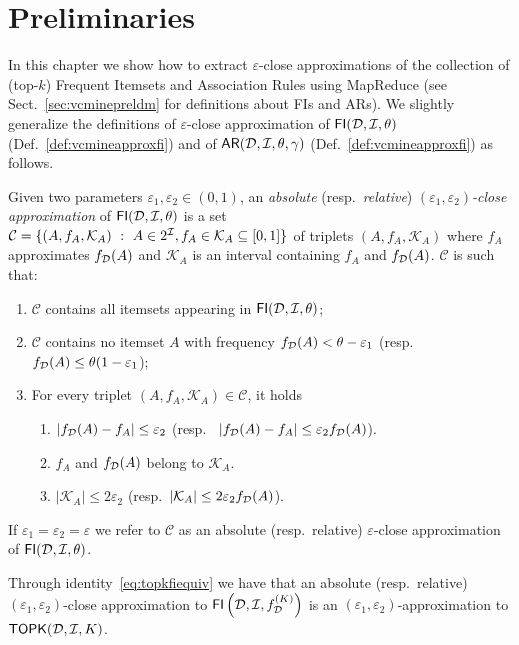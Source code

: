 \section{Preliminaries} \label{sec:parmadef}
In this chapter we show how to extract $\varepsilon$-close approximations of the
collection of (top-$k$) Frequent Itemsets and Association Rules using MapReduce
(see Sect.~\ref{sec:vcminepreldm} for definitions about FIs and ARs). We slightly
generalize the definitions of $\varepsilon$-close
approximation of $\mathsf{FI}({\cal D},{\cal I},\theta)$ (Def.~\ref{def:vcmineapproxfi}) and of
$\mathsf{AR}({\cal D},{\cal I},\theta,\gamma)$ (Def.~\ref{def:vcmineapproxfi}) as follows.

\begin{definition}\label{def:parmaeapproxfi}
  Given two parameters $\varepsilon_1,\varepsilon_2\in(0,1)$, an \emph{absolute}
  (resp.~\emph{relative}) \emph{
  $(\varepsilon_1,\varepsilon_2)$-close approximation} of
  $\mathsf{FI}({\cal D},{\cal I},\theta)$ is a set $\mathcal{C}=\{(A, f_A, \mathcal{K}_A) ~:~ A\in 2^{\cal I},
  f_A\in\mathcal{K}_A\subseteq[0,1]\}$ of triplets $(A, f_A, \mathcal{K}_A)$ where
  $f_A$ approximates $f_{\cal D}(A)$ and $\mathcal{K}_A$ is an interval containing
  $f_A$ and $f_{\cal D}(A)$.
  $\mathcal{C}$ is such that:
  \begin{enumerate}
    \item $\mathcal{C}$ contains all itemsets appearing in
      $\mathsf{FI}({\cal D},{\cal I},\theta)$;
    \item $\mathcal{C}$ contains no itemset $A$ with frequency $f_{\cal D}(A)<\theta -
      \varepsilon_1$ (resp.~ $f_{\cal D}(A)\le\theta(1-\varepsilon_1$);
    \item For every triplet $(A, f_A,\mathcal{K}_A)\in\mathcal{C}$, it holds
      \begin{enumerate}
       \item $|f_{\cal D}(A)-f_A|\le\varepsilon_2$ (resp.~
	 $|f_{\cal D}(A)-f_A|\le\varepsilon_2f_{\cal D}(A)$).
       \item $f_A$ and $f_{\cal D}(A)$ belong to $\mathcal{K}_A$.
       \item $|\mathcal{K}_A|\le 2\varepsilon_2$ (resp.~$|\mathcal{K}_A|\le
	 2\varepsilon_2f_{\cal D}(A)$).
     \end{enumerate}
  \end{enumerate}
  If $\varepsilon_1=\varepsilon_2=\varepsilon$ we refer to $\mathcal{C}$ 
  as an absolute (resp.~relative) $\varepsilon$-close approximation of
  $\mathsf{FI}({\cal D},{\cal I},\theta)$.
\end{definition} 

Through identity~\eqref{eq:topkfiequiv} we have that an absolute
(resp.~relative) $(\varepsilon_1,\varepsilon_2)$-close approximation to
$\mathsf{FI}\left({\cal D},{\cal I},f^{(K)}_{\cal D}\right)$ is an
$(\varepsilon_1,\varepsilon_2)$-approximation to $\mathsf{TOPK}({\cal D},{\cal I},K)$.

